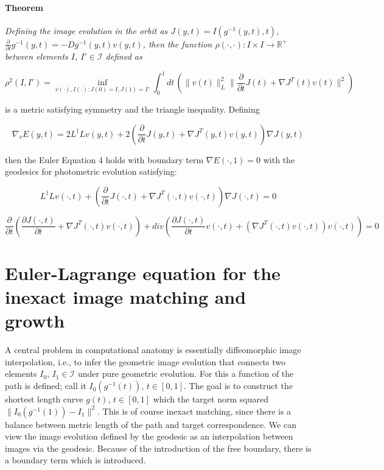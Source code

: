 \documentclass[preprint,review,8pt,times]{elsarticle}
\newcommand{\CA}{computational anatomy}
\begin{document}
\paragraph{Theorem}{\it Defining the image evolution in the orbit as $J(y, t) = I(g^{−1}(y, t), t)$, $\frac{\partial}{\partial t} g^{-1}(y, t) = −Dg^{−1}(y, t)v(y, t)$, then the function $\rho(\cdot, \cdot): I \times I \rightarrow \mathbb{R}^{+}$ between elements $I$, $I' \in \mathcal{I}$ defined as 

$$
\rho^{2}(I,I') = \underset{v(\cdot),I(\cdot):J(0) = I, J(1) = I'}{\inf} \int_{0}^{1} dt \, \left( \| v(t) \|_{L}^{2} \| \frac{\partial }{\partial t} J(t) + \nabla J^{T} (t)v(t)\|^{2} \right)
$$

is a metric satisfying symmetry and the triangle inequality. Defining

$$
\nabla_{v}E(y,t) = 2L^{\dag}Lv(y,t) + 2 \left( \frac{\partial}{\partial t} J(y,t) + \nabla J^{T}(y,t) v(y,t) \right) \nabla J(y,t)
$$

then the Euler Equation 4 holds with boundary term $\nabla E (\cdot, 1) = 0$ with the geodesics for photometric evolution satisfying:

$$
L^{\dag}Lv(\cdot,t) + \left( \frac{\partial}{\partial t} J(\cdot,t) + \nabla J^{T}(\cdot,t) v(\cdot,t) \right) \nabla J(\cdot,t) = 0
$$

$$
\frac{\partial}{\partial t}\left( \frac{\partial J(\cdot,t)}{\partial t} + \nabla J^{T}(\cdot,t) v(\cdot,t) \right) + div\left( \frac{\partial J(\cdot,t)}{\partial t} v(\cdot, t) + (\nabla J^{T}(\cdot,t) v(\cdot,t)) v(\cdot, t) \right) = 0
$$
}

\section{Euler-Lagrange equation for the inexact image matching and growth}

A central problem in \CA{} is essentially diffeomorphic image interpolation, i.e., to infer the geometric image evolution that connects two elements $I_{0}$, $I_{1} \in \mathcal{I}$ under pure geometric evolution. For this a function of the path is defined; call it $I_{0}(g^{−1}(t))$, $t \in [0, 1]$. The goal is to construct the shortest length curve $g(t)$, $t \in [0, 1]$ which  the target norm squared $\| I_{0} (g^{−1}(1)) − I_{1} \|^{2}$. This is of course inexact matching, since there is a balance between metric length of the path and target correspondence. We can view the image evolution defined by the geodesic as an interpolation between images via the geodesic. Because of the introduction of the free boundary, there is a boundary term which is introduced.
\end{document}
